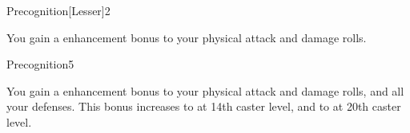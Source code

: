 \begin{spellsection}{Precognition}[Lesser]{2}
\begin{spellheader}
\end{spellheader}
\begin{spellcontent}
    \begin{spelltargetinginfo}
    \end{spelltargetinginfo}
    \begin{spelleffects}
        \spelleffect You gain a  enhancement bonus to your physical attack and damage rolls. \spellbonusscalingdescription
        \spelldur \durshort \dismissable
    \end{spelleffects}
\end{spellcontent}
\begin{spellfooter}
\end{spellfooter}
\end{spellsection}

\begin{spellsection}{Precognition}{5}
\begin{spellheader}
\end{spellheader}
\begin{spellcontent}
    \begin{spelltargetinginfo}
    \end{spelltargetinginfo}
    \begin{spelleffects}
        \spelleffect You gain a  enhancement bonus to your physical attack and damage rolls, and all your defenses. This bonus increases to  at 14th caster level, and to  at 20th caster level.
        \spelldur \durshort \dismissable
    \end{spelleffects}
\end{spellcontent}
\begin{spellfooter}
\end{spellfooter}
\end{spellsection}

